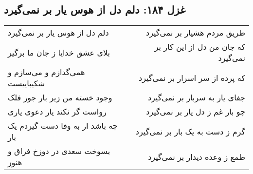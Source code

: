 \begin{center}
\section*{غزل ۱۸۴: دلم دل از هوس یار بر نمی‌گیرد}
\label{sec:184}
\begin{longtable}{l p{0.5cm} r}
دلم دل از هوس یار بر نمی‌گیرد
&&
طریق مردم هشیار بر نمی‌گیرد
\\
بلای عشق خدایا ز جان ما برگیر
&&
که جان من دل از این کار بر نمی‌گیرد
\\
همی‌گدازم و می‌سازم و شکیباییست
&&
که پرده از سر اسرار بر نمی‌گیرد
\\
وجود خسته من زیر بار جور فلک
&&
جفای یار به سربار بر نمی‌گیرد
\\
رواست گر نکند یار دعوی یاری
&&
چو بار غم ز دل یار بر نمی‌گیرد
\\
چه باشد ار به وفا دست گیردم یک بار
&&
گرم ز دست به یک بار بر نمی‌گیرد
\\
بسوخت سعدی در دوزخ فراق و هنوز
&&
طمع ز وعده دیدار بر نمی‌گیرد
\\
\end{longtable}
\end{center}
